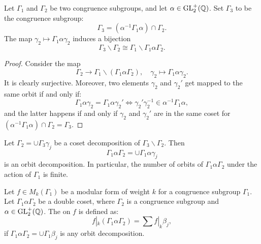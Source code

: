 \begin{proposition}
  Let $\Gamma_1$ and $\Gamma_2$ be two congruence subgroups, and let $\alpha\in\operatorname{GL}_2^+(\mathbb{Q})$. Set $\Gamma_3$ to be the congruence subgroup:
\[
\Gamma_3 = (\alpha^{-1}\Gamma_1\alpha)\cap \Gamma_2.
\]
The map $\gamma_2\mapsto \Gamma_1\alpha\gamma_2$ induces a bijection
\[
\Gamma_3\backslash \Gamma_2 \cong \Gamma_1\backslash \Gamma_1\alpha\Gamma_2.
\]
\end{proposition}
\begin{proof}
  Consider the map
\[
\Gamma_2\to\Gamma_1\backslash (\Gamma_1\alpha\Gamma_2),\quad \gamma_2\mapsto \Gamma_1\alpha\gamma_2.
\]
It is clearly surjective. Moreover, two elements $\gamma_2$ and $\gamma_2'$ get mapped to the same orbit if and only if:
\[
\Gamma_1\alpha\gamma_2=\Gamma_1\alpha\gamma_2'\iff \gamma_2'\gamma_2^{-1}\in\alpha^{-1}\Gamma_1\alpha,
\]
and the latter happens if and only if $\gamma_2$ and $\gamma_2'$ are in the same coset for $(\alpha^{-1}\Gamma_1\alpha) \cap\Gamma_2=\Gamma_3$.
\end{proof}
\begin{corollary}
  Let $\Gamma_2=\cup \Gamma_3\gamma_j$ be a coset decomposition of $\Gamma_3\backslash\Gamma_2$. Then
\[
\Gamma_1\alpha\Gamma_2=\cup \Gamma_1\alpha\gamma_j
\]
is an orbit decomposition. In particular, the number of orbits of $\Gamma_1\alpha\Gamma_2$ under the action of $\Gamma_1$ is finite.
\end{corollary}

  Let $f\in M_k(\Gamma_1)$ be a modular form of weight $k$ for a congruence subgroup $\Gamma_1$. Let $\Gamma_1\alpha\Gamma_2$ be a double coset, where $\Gamma_2$ is a congruence subgroup and $\alpha\in\operatorname{GL}_2^+(\mathbb{Q})$. The  on $f$ is defined as:
\[
f|_k (\Gamma_1\alpha\Gamma_2) = \sum f|_k \beta_j,
\]
if $\Gamma_1\alpha\Gamma_2=\cup \Gamma_1\beta_j$ is any orbit decomposition.

